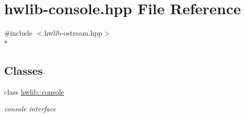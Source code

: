 \hypertarget{hwlib-console_8hpp}{}\section{hwlib-\/console.hpp File Reference}
\label{hwlib-console_8hpp}
{\ttfamily \#include $<$hwlib-\/ostream.\+hpp$>$}\\*
\subsection*{Classes}
\begin{DoxyCompactItemize}
\item 
class \hyperlink{classhwlib_1_1console}{hwlib\+::console}
\begin{DoxyCompactList}\small\item\em console interface \end{DoxyCompactList}\end{DoxyCompactItemize}
